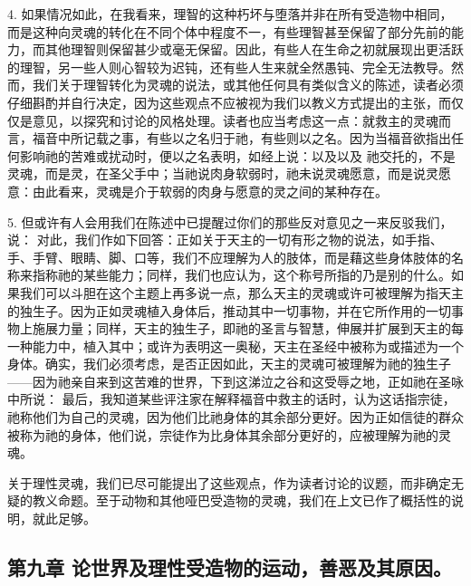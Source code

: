 4. 如果情况如此，在我看来，理智的这种朽坏与堕落并非在所有受造物中相同，而是这种向灵魂的转化在不同个体中程度不一，有些理智甚至保留了部分先前的能力，而其他理智则保留甚少或毫无保留。因此，有些人在生命之初就展现出更活跃的理智，另一些人则心智较为迟钝，还有些人生来就全然愚钝、完全无法教导。然而，我们关于理智转化为灵魂的说法，或其他任何具有类似含义的陈述，读者必须仔细斟酌并自行决定，因为这些观点不应被视为我们以教义方式提出的主张，而仅仅是意见，以探究和讨论的风格处理。读者也应当考虑这一点：就救主的灵魂而言，福音中所记载之事，有些以之名归于祂，有些则以之名。因为当福音欲指出任何影响祂的苦难或扰动时，便以之名表明，如经上说：以及以及 祂交托的，不是灵魂，而是灵，在圣父手中；当祂说肉身软弱时，祂未说灵魂愿意，而是说灵愿意：由此看来，灵魂是介于软弱的肉身与愿意的灵之间的某种存在。\par

5. 但或许有人会用我们在陈述中已提醒过你们的那些反对意见之一来反驳我们，说： 对此，我们作如下回答：正如关于天主的一切有形之物的说法，如手指、手、手臂、眼睛、脚、口等，我们不应理解为人的肢体，而是藉这些身体肢体的名称来指称祂的某些能力；同样，我们也应认为，这个称号所指的乃是别的什么。如果我们可以斗胆在这个主题上再多说一点，那么天主的灵魂或许可被理解为指天主的独生子。因为正如灵魂植入身体后，推动其中一切事物，并在它所作用的一切事物上施展力量；同样，天主的独生子，即祂的圣言与智慧，伸展并扩展到天主的每一种能力中，植入其中；或许为表明这一奥秘，天主在圣经中被称为或描述为一个身体。确实，我们必须考虑，是否正因如此，天主的灵魂可被理解为祂的独生子——因为祂亲自来到这苦难的世界，下到这涕泣之谷和这受辱之地，正如祂在圣咏中所说： 最后，我知道某些评注家在解释福音中救主的话时，认为这话指宗徒，祂称他们为自己的灵魂，因为他们比祂身体的其余部分更好。因为正如信徒的群众被称为祂的身体，他们说，宗徒作为比身体其余部分更好的，应被理解为祂的灵魂。\par

关于理性灵魂，我们已尽可能提出了这些观点，作为读者讨论的议题，而非确定无疑的教义命题。至于动物和其他哑巴受造物的灵魂，我们在上文已作了概括性的说明，就此足够。\par


\subsection{第九章 论世界及理性受造物的运动，善恶及其原因。}

